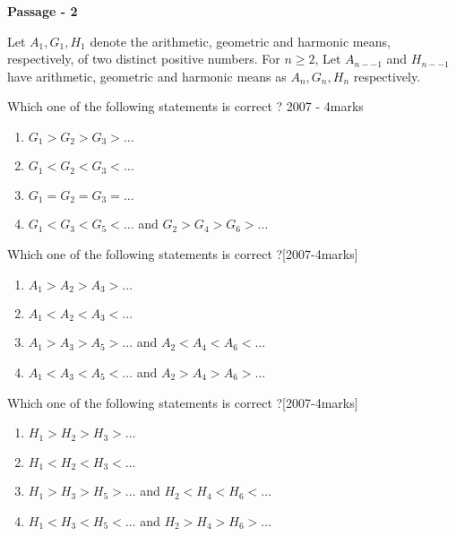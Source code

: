 \iffalse
\title{Assignment -1}
\author{ee24btech11017-karthik}
\section{paragraph}
\fi

\item \textbf{ Passage - 2 }

Let $A_{1}, G_{1}, H_{1} $ denote the arithmetic, geometric and harmonic means, respectively, of two distinct positive numbers. For $n\geq 2$, Let $A_{n--1}$ and $H_{n--1}$ have arithmetic, geometric and harmonic means as $A_{n},G_{n},H_{n}$ respectively.
  
\item Which one of the following statements is correct ? \hfill{2007 - 4marks}
\begin{enumerate}
	\item$G_{1}>G_{2}>G_{3}>\dots$ 
	\item$G_{1}<G_{2}<G_{3}<\dots$
	\item$G_{1}=G_{2}=G_{3}=\dots$
	\item$G_{1}<G_{3}<G_{5}<\dots$ and $G_{2}>G_{4}>G_{6}>\dots$
\end{enumerate}

\item Which one of the following statements is correct ?\hfill[2007-4marks]
\begin{enumerate}
	\item $A_{1}>A_{2}>A_{3}>\dots$ 
	\item $A_{1}<A_{2}<A_{3}<\dots$
	\item $A_{1}>A_{3}>A_{5}>\dots$ and $A_{2}<A_{4}<A_{6}<\dots$
	\item $A_{1}<A_{3}<A_{5}<\dots$ and $A_{2}>A_{4}>A_{6}>\dots$
\end{enumerate}

\item Which one of the following statements is correct ?\hfill[2007-4marks]
\begin{enumerate}
	\item $H_{1}>H_{2}>H_{3}>\dots$ 
	\item $H_{1}<H_{2}<H_{3}<\dots$
	\item $H_{1}>H_{3}>H_{5}>\dots$ and $H_{2}<H_{4}<H_{6}<\dots$
	\item $H_{1}<H_{3}<H_{5}<\dots$ and $H_{2}>H_{4}>H_{6}>\dots$
\end{enumerate}
